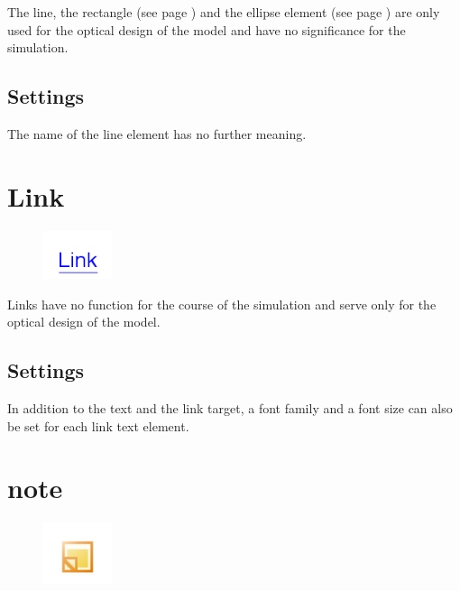 The line, the rectangle (see page \pageref{ref:ModelElementRectangle}) and the
ellipse element (see page \pageref{ref:ModelElementEllipse}) 
are only used for the optical design of the model and have no significance for the simulation.

\subsection*{Settings}

The name of the line element has no further meaning.


\section{Link}
\label{ref:ModelElementLink}

\begin{figure}
\vspace{-22pt}
\includegraphics[width=2cm]{imageModelElementLink.png}
\vspace{-22pt}
\end{figure}

Links have no function for the course of the simulation
and serve only for the optical design of the model.

\subsection*{Settings}

In addition to the text and the link target, a font family and a font size can also be set for each link text element.


\section{note}
\label{ref:ModelElementNote}

\begin{figure}
\vspace{-22pt}
\includegraphics[width=2cm]{imageModelElementNote.png}
\vspace{-22pt}
\end{figure}

